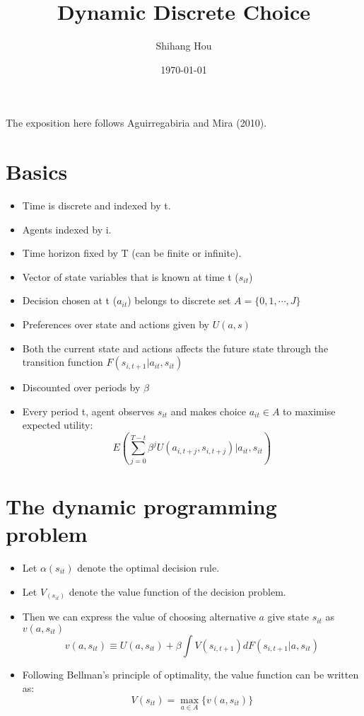 \documentclass[11pt]{article}
\title{Dynamic Discrete Choice\vspace{-2ex}}
\author{Shihang Hou\vspace{-2ex}}
\date{\today \vspace{-2ex}}
\begin{document}
	\maketitle

The exposition here follows Aguirregabiria and Mira (2010).

\section{Basics}

\begin{itemize}
    \item Time is discrete and indexed by t.
    \item Agents indexed by i.
    \item Time horizon fixed by T (can be finite or infinite).
    \item Vector of state variables that is known at time t ($s_{it}$)
    \item Decision chosen at t ($a_{it}$) belongs to discrete set $A = \{0,1,\cdots,J\}$
    \item Preferences over state and actions given by $U(a,s)$
    \item Both the current state and actions affects the future state through the transition function $F(s_{i,t+1}|a_{it},s_{it})$
    \item Discounted over periods by $\beta$
    \item Every period t, agent observes $s_{it}$ and makes choice $a_{it} \in A$ to maximise expected utility:
    \begin{equation}
     E(\sum_{j=0}^{T-t} \beta^j U(a_{i,t+j},s_{i,t+j}) | a_{it},s_{it})   
    \end{equation}
\end{itemize}

\section{The dynamic programming problem}

\begin{itemize}
    \item Let $\alpha(s_{it})$ denote the optimal decision rule.
    \item Let $V_(s_{it})$ denote the value function of the decision problem.
    \item Then we can express the value of choosing alternative $a$ give state $s_{it}$ as $v(a,s_{it})$
    \begin{equation}
        v(a,s_{it}) \equiv U(a,s_{it}) + \beta \int V(s_{i,t+1}) dF(s_{i,t+1}|a,s_{it})
    \end{equation}
    \item Following Bellman's principle of optimality, the value function can be written as:
    \begin{equation}
        V(s_{it}) = \max_{a \in A} \{v(a,s_{it})\}
    \end{equation}
\end{itemize}
\end{document}
